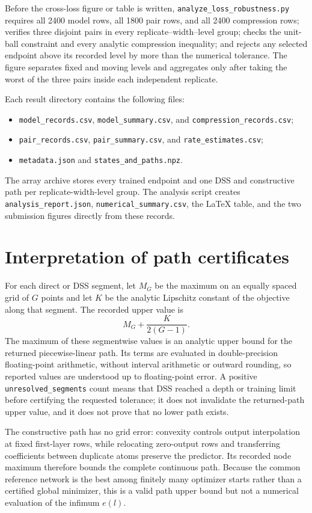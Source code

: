 \documentclass[11pt,a4paper]{article}
\begin{document}
Before the cross-loss figure or table is written, \texttt{analyze\_loss\_robustness.py} requires all 2400 model rows, all 1800 pair rows, and all 2400 compression rows; verifies three disjoint pairs in every replicate--width--level group; checks the unit-ball constraint and every analytic compression inequality; and rejects any selected endpoint above its recorded level by more than the numerical tolerance. The figure separates fixed and moving levels and aggregates only after taking the worst of the three pairs inside each independent replicate.

Each result directory contains the following files:
\begin{itemize}
\item \texttt{model\_records.csv}, \texttt{model\_summary.csv}, and \texttt{compression\_records.csv};
\item \texttt{pair\_records.csv}, \texttt{pair\_summary.csv}, and \texttt{rate\_estimates.csv};
\item \texttt{metadata.json} and \texttt{states\_and\_paths.npz}.
\end{itemize}
The array archive stores every trained endpoint and one DSS and constructive path per replicate-width-level group. The analysis script creates \texttt{analysis\_report.json}, \texttt{numerical\_summary.csv}, the LaTeX table, and the two submission figures directly from these records.

\section*{Interpretation of path certificates}

For each direct or DSS segment, let $M_G$ be the maximum on an equally spaced grid of $G$ points and let $K$ be the analytic Lipschitz constant of the objective along that segment. The recorded upper value is
\[
M_G+\frac{K}{2(G-1)}.
\]
The maximum of these segmentwise values is an analytic upper bound for the returned piecewise-linear path. Its terms are evaluated in double-precision floating-point arithmetic, without interval arithmetic or outward rounding, so reported values are understood up to floating-point error. A positive \texttt{unresolved\_segments} count means that DSS reached a depth or training limit before certifying the requested tolerance; it does not invalidate the returned-path upper value, and it does not prove that no lower path exists.

The constructive path has no grid error: convexity controls output interpolation at fixed first-layer rows, while relocating zero-output rows and transferring coefficients between duplicate atoms preserve the predictor. Its recorded node maximum therefore bounds the complete continuous path. Because the common reference network is the best among finitely many optimizer starts rather than a certified global minimizer, this is a valid path upper bound but not a numerical evaluation of the infimum $e(l)$.
\end{document}
